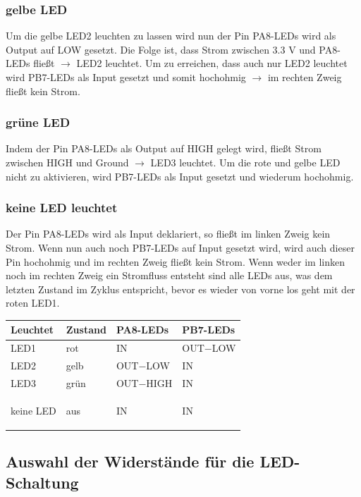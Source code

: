 \documentclass[a4paper,
DIV=13,
12pt,
BCOR=10mm,
department=FakEI,
parskip=half,
automark,
]{article}
\begin{document}
\subsubsection{gelbe LED}
Um die gelbe LED2 leuchten zu lassen wird nun der Pin \glqq PA8-LEDs\grqq{} wird als Output auf \glqq LOW\grqq{} gesetzt. Die Folge ist, dass Strom zwischen 3.3 V und \glqq PA8-LEDs\grqq{} fließt $\rightarrow$ LED2 leuchtet. Um zu erreichen, dass auch nur LED2 leuchtet wird \glqq PB7-LEDs\grqq{} als Input gesetzt und somit hochohmig $\rightarrow$ im rechten Zweig fließt kein Strom.
\subsubsection{grüne LED}
Indem der Pin \glqq PA8-LEDs\grqq{} als Output auf \glqq HIGH\grqq{} gelegt wird, fließt Strom zwischen \glqq HIGH\grqq{} und Ground $\rightarrow$ LED3 leuchtet. Um die rote und gelbe LED nicht zu aktivieren, wird \glqq PB7-LEDs\grqq{} als Input gesetzt und wiederum hochohmig. 
\subsubsection{keine LED leuchtet}
Der Pin \glqq PA8-LEDs\grqq{} wird als Input deklariert, so fließt im linken Zweig kein Strom. Wenn nun auch noch \glqq PB7-LEDs\grqq{} auf Input gesetzt wird, wird auch dieser Pin hochohmig und im rechten Zweig fließt kein Strom. Wenn weder im linken noch im rechten Zweig ein Stromfluss entsteht sind alle LEDs aus, was dem letzten Zustand im Zyklus entspricht, bevor es wieder von vorne los geht mit der roten LED1.

\begin{center}
\begin{tabularx}{\columnwidth}{XXXl}
Leuchtet &Zustand &PA8-LEDs &PB7-LEDs \\ \hline
LED1 & rot & IN &OUT$-$LOW\\
LED2 & gelb & OUT$-$LOW &IN\\
LED3 & grün & OUT$-$HIGH & IN\\
keine LED & aus & IN & IN
 
\label{tab:ZusammenfassungderFunktionsweisederLEDSchaltung}
\end{tabularx}
\end{center}

\subsection{Auswahl der Widerstände für die LED-Schaltung}
\end{document}
